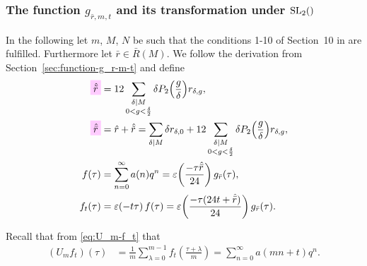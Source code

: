 \documentclass{article}
\begin{document}
\subsubsection{The function $g_{\bar{r},m,t}$ and its transformation
  under $\SL2Z$}
\label{sec:function-g_rbar-m-t}

In the following let $m$, $M$, $N$ be such that the conditions 1-10 of
Section~10 in
\cite{Chen+Du+Zhao:FindingModularFunctionsRamanujan:2019} are
fulfilled.
Furthermore let $\bar{r}\in\bar{R}(M)$.
%
We follow the derivation from Section~\ref{sec:function-g_r-m-t} and
define
\begin{align}
  \defineNotation[rtilde^{}]{\sumdelta{\tilde{r}}}
  &=
  12 \sum_{\substack{\divides{\delta}{M}\\0 < g < \frac{\delta}{2}}}
           \delta P_2\Bigl(\frac{g}{\delta}\Bigr) r_{\delta,g},
  \notag\\
  \defineNotation[rbar^{}]{\sumdelta{\bar{r}}}
  &= \sumdelta{r} + \sumdelta{\tilde{r}}
  =
  \divisorsum{M} \delta r_{\delta,0}
  + 12 \sum_{\substack{\divides{\delta}{M}\\0 < g < \frac{\delta}{2}}}
           \delta P_2\Bigl(\frac{g}{\delta}\Bigr) r_{\delta,g},
  \notag\\
  f(\tau)
  &=
  \sum_{n=0}^\infty a(n) q^n
    =
    \unityPower{\frac{- \tau \sumdelta{\bar{r}}}{24}} g_{\bar{r}}(\tau),
  \notag\\
  f_t(\tau)
  &=
    \unityPower{- t \tau} f(\tau)
    =
    \unityPower{\frac{- \tau (24t + \sumdelta{\bar{r}})}{24}} g_{\bar{r}}(\tau).
\end{align}

Recall that from \eqref{eq:U_m-f_t} that
\begin{align*}
  (U_mf_t)(\tau)
  &=
  \frac{1}{m} \sum_{\lambda=0}^{m-1}f_t\left(\frac{\tau+\lambda}{m}\right)
  =
    \sum_{n=0}^\infty a(mn+t) q^n.
\end{align*}
\end{document}

